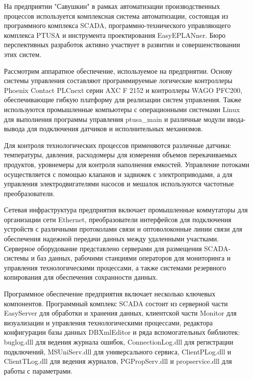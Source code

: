 {\gostFont
	
	\par \redline На предприятии "Савушкин" в рамках автоматизации производственных процессов используется комплексная система автоматизации, состоящая из программного комплекса SCADA, программно-технического управляющего комплекса PTUSA и инструмента проектирования EasyEPLANner. Бюро перспективных разработок активно участвует в развитии и совершенствовании этих систем.
	
	\par \redline Рассмотрим аппаратное обеспечение, используемое на предприятии. Основу системы управления составляют программируемые логические контроллеры Phoenix Contact PLCnext серии AXC F 2152 и контроллеры WAGO PFC200, обеспечивающие гибкую платформу для реализации систем управления. Также используются промышленные компьютеры с операционными системами Linux для выполнения программы управления ptusa\_main и различные модули ввода-вывода для подключения датчиков и исполнительных механизмов.
	
	\par \redline Для контроля технологических процессов применяются различные датчики: температуры, давления, расходомеры для измерения объемов перекачиваемых продуктов, уровнемеры для контроля наполнения емкостей. Управление потоками осуществляется с помощью клапанов и задвижек с электроприводами, а для управления электродвигателями насосов и мешалок используются частотные преобразователи.
	
	\par \redline Сетевая инфраструктура предприятия включает промышленные коммутаторы для организации сети Ethernet, преобразователи интерфейсов для подключения устройств с различными протоколами связи и оптоволоконные линии связи для обеспечения надежной передачи данных между удаленными участками. Серверное оборудование представлено серверами для размещения SCADA-системы и баз данных, рабочими станциями операторов для мониторинга и управления технологическими процессами, а также системами резервного копирования для обеспечения сохранности данных.
	
	\par \redline Программное обеспечение предприятия включает несколько ключевых компонентов. Программный комплекс SCADA состоит из серверной части EasyServer для обработки и хранения данных, клиентской части Monitor для визуализации и управления технологическими процессами, редактора конфигурации базы данных DBXmlEditor и ряда вспомогательных библиотек: buglog.dll для ведения журнала ошибок, ConnectionLog.dll для регистрации подключений, MSUniServ.dll для универсального сервиса, ClientPLog.dll и ClientTLog.dll для ведения журналов, PGPropServ.dll и propservice.dll для работы с параметрами.
	
}
